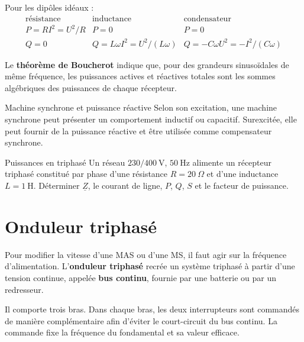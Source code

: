 Pour les dipôles idéaux :
\[
\begin{array}{c|c|c}
\text{résistance} & \text{inductance} & \text{condensateur}\\ \hline
P=RI^2=U^2/R & P=0 & P=0\\
Q=0 & Q=L\omega I^2=U^2/(L\omega) & Q=-C\omega U^2=-I^2/(C\omega)
\end{array}
\]

Le \textbf{théorème de Boucherot} indique que, pour des grandeurs sinusoïdales de même fréquence, les puissances actives et réactives totales sont les sommes algébriques des puissances de chaque récepteur.

\begin{TLMachineWarning}{Machine synchrone et puissance réactive}
Selon son excitation, une machine synchrone peut présenter un comportement inductif ou capacitif. Surexcitée, elle peut fournir de la puissance réactive et être utilisée comme compensateur synchrone.
\end{TLMachineWarning}

\begin{TLMachineExercise}{Puissances en triphasé}
Un réseau $230/400\ \mathrm V$, $50\ \mathrm{Hz}$ alimente un récepteur triphasé constitué par phase d'une résistance $R=20\ \Omega$ et d'une inductance $L=1\ \mathrm H$. Déterminer $\underline Z$, le courant de ligne, $P$, $Q$, $S$ et le facteur de puissance.
\end{TLMachineExercise}

\section{Onduleur triphasé}
\label{sec:masms-2}

Pour modifier la vitesse d'une MAS ou d'une MS, il faut agir sur la fréquence d'alimentation. L'\textbf{onduleur triphasé} recrée un système triphasé à partir d'une tension continue, appelée \textbf{bus continu}, fournie par une batterie ou par un redresseur.

\begin{center}\TLOnduleurTriphas\end{center}

Il comporte trois bras. Dans chaque bras, les deux interrupteurs sont commandés de manière complémentaire afin d'éviter le court-circuit du bus continu. La commande fixe la fréquence du fondamental et sa valeur efficace.


